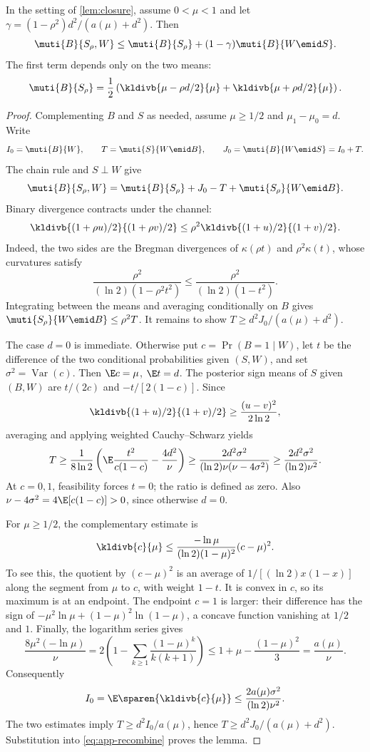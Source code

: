 \begin{lemma}\label{lem:consistency}
In the setting of \autoref{lem:closure}, assume $0<\mu<1$ and let
$\gamma=(1-\rho^2)d^2/(a(\mu)+d^2)$. Then
\begin{equation}\label{eq:recombination-information}
 \muti{B}{S_\rho,W}
 \le\muti{B}{S_\rho}+(1-\gamma)\muti{B}{W\emid S}.
\end{equation}
The first term depends only on the two means:
\[
 \muti{B}{S_\rho}
 =\frac12\left(\kldivb{\mu-\rho d/2}{\mu}
                  +\kldivb{\mu+\rho d/2}{\mu}\right).
\]
\end{lemma}
\begin{proof}
Complementing $B$ and $S$ as needed, assume $\mu\ge1/2$ and
$\mu_1-\mu_0=d$. Write
\[
 I_0=\muti{B}{W},\qquad T=\muti{S}{W\emid B},\qquad
 J_0=\muti{B}{W\emid S}=I_0+T.
\]
The chain rule and $S\perp W$ give
\begin{equation}\label{eq:app-recombine}
 \muti{B}{S_\rho,W}
 =\muti{B}{S_\rho}+J_0-T+\muti{S_\rho}{W\emid B}.
\end{equation}
Binary divergence contracts under the channel:
\[
 \kldivb{(1+\rho u)/2}{(1+\rho v)/2}
 \le\rho^2\kldivb{(1+u)/2}{(1+v)/2}.
\]
Indeed, the two sides are the Bregman divergences of
$\kappa(\rho t)$ and $\rho^2\kappa(t)$, whose curvatures satisfy
\[
 \frac{\rho^2}{(\ln2)(1-\rho^2t^2)}
 \le\frac{\rho^2}{(\ln2)(1-t^2)}.
\]
Integrating between the means and averaging conditionally on $B$ gives
$\muti{S_\rho}{W\emid B}\le\rho^2T$.
It remains to show $T\ge d^2J_0/(a(\mu)+d^2)$.

The case $d=0$ is immediate. Otherwise put
$c=\Pr(B=1\mid W)$, let $t$ be the difference of the two conditional
probabilities given $(S,W)$, and set
$\sigma^2=\operatorname{Var}(c)$.
Then $\E c=\mu$, $\E t=d$. The posterior sign means of $S$ given
$(B,W)$ are $t/(2c)$ and $-t/[2(1-c)]$. Since
\[
 \kldivb{(1+u)/2}{(1+v)/2}\ge\frac{(u-v)^2}{2\ln2},
\]
averaging and applying weighted Cauchy--Schwarz yields
\[
 T\ge\frac1{8\ln2}\left(\E\frac{t^2}{c(1-c)}-\frac{4d^2}{\nu}\right)
 \ge\frac{2d^2\sigma^2}{(\ln2)\nu(\nu-4\sigma^2)}
 \ge\frac{2d^2\sigma^2}{(\ln2)\nu^2}.
\]
At $c=0,1$, feasibility forces $t=0$; the ratio is defined as zero.
Also $\nu-4\sigma^2=4\E[c(1-c)]>0$, since otherwise $d=0$.

For $\mu\ge1/2$, the complementary estimate is
\begin{equation}\label{eq:binary-kl-upper}
 \kldivb{c}{\mu}
 \le\frac{-\ln\mu}{(\ln2)(1-\mu)^2}(c-\mu)^2.
\end{equation}
To see this, the quotient by $(c-\mu)^2$ is an average of
$1/[(\ln2)x(1-x)]$ along the segment from $\mu$ to $c$, with
weight $1-t$. It is convex in $c$, so its maximum is at an endpoint.
The endpoint $c=1$ is larger: their difference has the sign of
$-\mu^2\ln\mu+(1-\mu)^2\ln(1-\mu)$, a concave function vanishing
at $1/2$ and $1$.
Finally, the logarithm series gives
\[
 \frac{8\mu^2(-\ln\mu)}\nu
 =2\left(1-\sum_{k\ge1}\frac{(1-\mu)^k}{k(k+1)}\right)
 \le1+\mu-\frac{(1-\mu)^2}{3}=\frac{a(\mu)}\nu.
\]
Consequently
\[
 I_0=\E\sparen{\kldivb{c}{\mu}}
 \le\frac{2a(\mu)\sigma^2}{(\ln2)\nu^2}.
\]
The two estimates imply $T\ge d^2I_0/a(\mu)$, hence
$T\ge d^2J_0/(a(\mu)+d^2)$. Substitution into
\eqref{eq:app-recombine} proves the lemma.
\end{proof}
